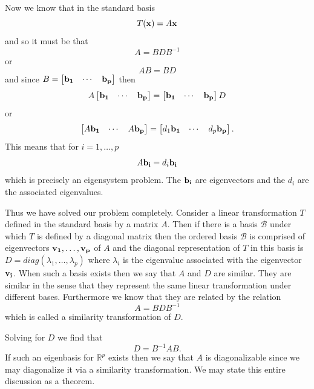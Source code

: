 \documentclass{book}
\begin{document}
Now we know that in the standard basis
$$
T({\bf x})=A{\bf x}
$$
and so it must be that
$$
A=BDB^{-1}
$$
or
$$
AB=BD
$$
and since 
$
B=
\begin{bmatrix}
{\bf b_1}& \cdots& {\bf b_p}
\end{bmatrix}$
 then
$$
A\begin{bmatrix}{\bf b_1}& \cdots& {\bf b_p}\end{bmatrix} = \begin{bmatrix}{\bf b_1}& \cdots& {\bf b_p}\end{bmatrix}D
$$
or
$$
\begin{bmatrix}A{\bf b_1}& \cdots& A{\bf b_p}\end{bmatrix} =\begin{bmatrix}d_1{\bf b_1}& \cdots& d_p{\bf b_p}\end{bmatrix}.
$$
This means that for $i=1,\ldots,p$
$$
A{\bf b_i}=d_i{\bf b_i}
$$
which is precisely an eigensystem problem. The ${\bf b_i}$ are eigenvectors and the $d_i$ are the associated eigenvalues. \vspace{.5cm}

Thus we have solved our problem completely. Consider a linear transformation $T$ defined in the standard basis by a matrix $A$. Then if there is a basis $\mathscr{B}$ under which $T$ is defined by a diagonal matrix then the ordered basis $\mathscr{B}$ is comprised of eigenvectors ${\bf v_1},\ldots,{\bf v_p}$ of $A$ and the diagonal representation of $T$ in this basis is $D=diag(\lambda_1,\ldots,\lambda_p)$ where $\lambda_i$ is the eigenvalue associated with the eigenvector ${\bf v_i}$. When such a basis exists then we say that $A$ and $D$ are similar. They are similar in the sense that they represent the same linear transformation under different bases. Furthermore we know that they are related by the relation
$$
A=BDB^{-1}
$$
which is called a similarity transformation of $D$. 

Solving for $D$ we find that
$$
D=B^{-1}AB.
$$
If such an eigenbasis for $\mathbb{R}^p$ exists then we say that $A$ is diagonalizable since we may diagonalize it via a similarity transformation. We may state this entire discussion as a theorem. 
\end{document}
